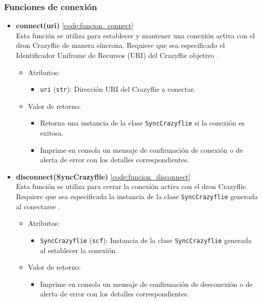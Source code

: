 \subsubsection{Funciones de conexión}
\begin{itemize}
	\item \textbf{connect(uri)} \ref{code:funcion_connect} \\ 
	Esta función se utiliza para establecer y mantener una conexión activa con el dron Crazyflie de manera síncrona. Requiere que sea especificado el Identificador Unifrome de Recursos (URI) del Crazyflie objetivo . 
	\begin{itemize}
		\item Atributos:
		\begin{itemize}
			\item \texttt{uri} (\texttt{str}): Dirección URI del Crazyflie a conectar.
		\end{itemize}
		\item Valor de retorno:
		\begin{itemize}
			\item Retorna una instancia de la clase \texttt{SyncCrazyflie} si la conexión es exitosa.
			\item Imprime en consola un mensaje de confirmación de conexión o de alerta de error con los detalles correspondientes.
		\end{itemize}
	\end{itemize} 

	\item \textbf{disconnect(SyncCrazyflie)} \ref{code:funcion_disconnect} \\ 
	Esta función se utiliza para cerrar la conexión activa con el dron Crazyflie. Requiere que sea especificada la instancia de la clase \texttt{SyncCrazyflie} generada al conectarse . 
	\begin{itemize}
		\item Atributos:
		\begin{itemize}
			\item \texttt{SyncCrazyflie} (\texttt{scf}): Instancia de la clase \texttt{SyncCrazyflie} generada al establecer la conexión.
		\end{itemize}
		\item Valor de retorno:
		\begin{itemize}
			\item Imprime en consola un mensaje de confirmación de desconexión o de alerta de error con los detalles correspondientes.
		\end{itemize}
	\end{itemize} 
\end{itemize}

